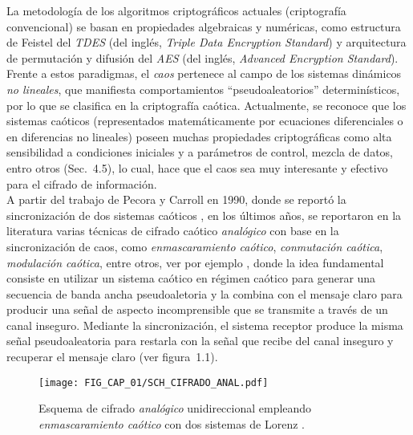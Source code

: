 La metodología de los algoritmos criptográficos actuales (criptografía convencional) se basan en propiedades algebraicas y numéricas, como estructura de Feistel del \textit{TDES} (del inglés, \textit{Triple Data Encryption Standard}) y arquitectura de permutación y difusión del \textit{AES} (del inglés, \textit{Advanced Encryption Standard}). Frente a estos paradigmas, el \textit{caos} pertenece al campo de los sistemas dinámicos \textit{no lineales}, que manifiesta comportamientos ``pseudoaleatorios'' determinísticos, por lo que se clasifica en la criptografía caótica. Actualmente, se reconoce que los sistemas caóticos (representados matemáticamente por ecuaciones diferenciales o en diferencias no lineales) poseen muchas propiedades criptográficas como alta sensibilidad a condiciones iniciales y a parámetros de control, mezcla de datos, entro otros (Sec.~4.5), lo cual, hace que el caos sea muy interesante y efectivo para el cifrado de información. \\

A partir del trabajo de Pecora y Carroll en 1990, donde se reportó la sincronización de dos sistemas caóticos \cite{PyC_1990,PyC_1991}, en los últimos años, se reportaron en la literatura varias técnicas de cifrado caótico \textit{analógico} con base en la sincronización de caos, como \textit{enmascaramiento caótico}, \textit{conmutación caótica}, \textit{modulación caótica}, entre otros, ver por ejemplo \cite{CEtAl_1992, CyO_1992, CyO_1993, CEtAl_1993, MyZ_1996, GEtAl_2000, C_2004, PEtAl_2004, LyC_2004, LyC_2005, CEtAl_2005, LEtAl_2005, CyR_2006, PEtAl_2007, AEtAl_2008a, LEtAl_2009a, LEtAl_2009b, GEtAl_2009, SEtAl_2010a, CEtAl_2012, AEtAl_2012b}, donde la idea fundamental consiste en utilizar un sistema caótico en régimen caótico para generar una secuencia de banda ancha pseudoaletoria y la combina con el mensaje claro para producir una señal de aspecto incomprensible que se transmite a través de un canal inseguro. Mediante la sincronización, el sistema receptor produce la misma señal pseudoaleatoria para restarla con la señal que recibe del canal inseguro y recuperar el mensaje claro (ver figura~1.1). \\

\begin{figure}[!htbp] %
	\center
	\texttt{[image: FIG\_CAP\_01/SCH\_CIFRADO\_ANAL.pdf]}  
	\caption{Esquema de cifrado \textit{analógico} unidireccional empleando \textit{enmascaramiento caótico} con dos sistemas de Lorenz \cite{CEtAl_1993}.}
\end{figure}

